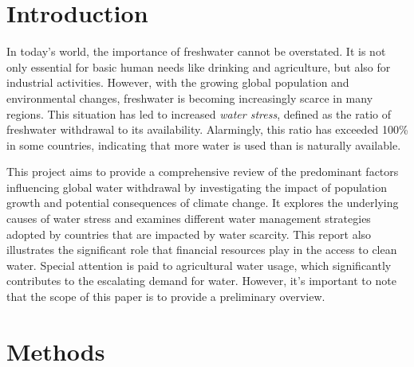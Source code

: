 \documentclass{article}
\theoremstyle{plain}
\theoremstyle{definition}
\theoremstyle{remark}
\begin{document}

\section{Introduction}
In today's world, the importance of freshwater cannot be overstated. It is not only essential for basic human needs like drinking and agriculture, but also for industrial activities. However, with the growing global population and environmental changes, freshwater is becoming increasingly scarce in many regions. This situation has led to increased \textit{water stress}, defined as the ratio of freshwater withdrawal to its availability. Alarmingly, this ratio has exceeded 100\% in some countries, indicating that more water is used than is naturally available. %

This project aims to provide a comprehensive review of the predominant factors influencing global water withdrawal by investigating the impact of population growth and potential consequences of climate change. It explores the underlying causes of water stress and examines different water management strategies adopted by countries that are impacted by water scarcity. This report also illustrates the significant role that financial resources play in the access to clean water. Special attention is paid to agricultural water usage, which significantly contributes to the escalating demand for water. However, it's important to note that the scope of this paper is to provide a preliminary overview.\\

\section{Methods}
\end{document}
